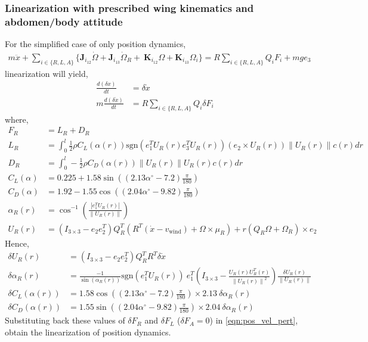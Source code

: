 \documentclass[10pt]{article}
\newcommand{\norm}[1]{\ensuremath{\left\| #1 \right\|}}
\begin{document}
\subsubsection{Linearization with prescribed wing kinematics and abdomen/body attitude}
For the simplified case of only position dynamics,
\begin{align*}
m\ddot x + 
\sum_{i\in\{R,L,A\}} \big\{ \mathbf{J}_{i_{12}} \dot\Omega + \mathbf{J}_{i_{13}}\dot\Omega_R 
+ \ \mathbf{K}_{i_{12}}\Omega + \mathbf{K}_{i_{13}}\Omega_i \big\} = R\sum_{i\in\{R,L,A\}} Q_i F_i + mg e_3
\end{align*}
linearization will yield,
\begin{align}
\frac{d (\delta x)}{dt} &= \delta \dot{x} \nonumber \\
m \frac{d (\delta \dot{x} )}{dt} &= R \sum_{i\in\{R,L,A\}} Q_i \delta F_i \label{eqn:pos_vel_pert}
\end{align}
where,
\begin{align*}
F_R &= L_R + D_R \\
L_R &= \int_{0}^{l} \frac{1}{2}\rho  C_L(\alpha(r)) \mathrm{sgn} (e_1^T U_R(r) e_3^T U_R(r)) (e_2\times U_R(r))\|U_R(r)\| c(r) dr \\
D_R &= \int_{0}^{l} - \frac{1}{2}\rho  C_D(\alpha(r)) \|U_R(r)\|U_R(r) c(r) dr \\
C_L(\alpha) & = 0.225 + 1.58 \sin( (2.13\alpha^\circ - 7.2) \frac{\pi}{180}) \\
C_D(\alpha) & = 1.92 - 1.55 \cos( (2.04 \alpha^\circ - 9.82 ) \frac{\pi}{180}) \\
\alpha_R (r) & = \cos^{-1} ( \frac{|e_1^T U_R(r)|}{\|U_R(r)\|} ) \\
U_R(r) &= (I_{3\times 3}- e_2 e_2^T) Q_R^T( R^T (\dot x-v_{\mathrm{wind}}) + \Omega\times \mu_R ) + r  (Q_R\Omega + \Omega_R )\times e_2
\end{align*}
Hence,
\begin{align*}
\delta U_R(r) &= (I_{3\times 3}- e_2 e_2^T) Q_R^T R^T \delta\dot x \\
\delta \alpha_R(r) &= \frac{-1}{\sin(\alpha_R(r))} \mathrm{sgn}(e_1^T U_R(r))\ e_1^T\left(I_{3\times 3} - \frac{U_R(r)U_R^T(r)}{\norm{U_R(r)}^2}\right) \frac{\delta U_R(r)}{\norm{U_R(r)}} \\
\delta C_L(\alpha(r)) &= 1.58 \cos( (2.13\alpha^\circ - 7.2) \frac{\pi}{180}) \times 2.13\ \delta\alpha_R(r) \\
\delta C_D(\alpha(r)) &= 1.55 \sin( (2.04 \alpha^\circ - 9.82 ) \frac{\pi}{180}) \times 2.04\ \delta\alpha_R(r)
\end{align*}
Substituting back these values of $ \delta F_R $ and $ \delta F_L $ ($ \delta F_A = 0 $) in \eqref{eqn:pos_vel_pert}, obtain the linearization of position dynamics.
\end{document}

